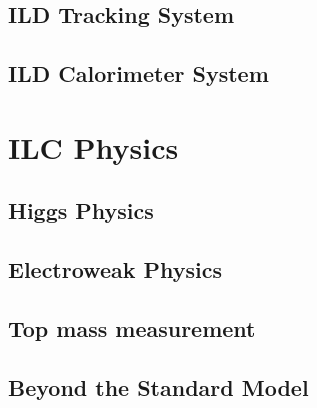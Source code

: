 \subsection{ILD Tracking System}

\subsection{ILD Calorimeter System}

\section{ILC Physics}
\label{sec:ILC_Physics}

\subsection{Higgs Physics}
\subsection{Electroweak Physics}
\subsection{Top mass measurement}
\subsection{Beyond the Standard Model}
